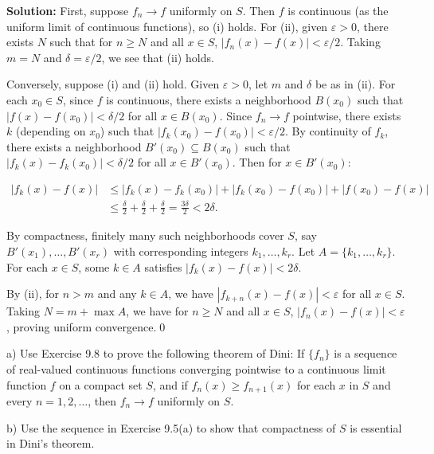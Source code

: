 \bigskip\noindent\textbf{Solution:} First, suppose \( f_n \to f \) uniformly on \( S \). Then \( f \) is continuous (as the uniform limit of continuous functions), so (i) holds. For (ii), given \( \varepsilon > 0 \), there exists \( N \) such that for \( n \geq N \) and all \( x \in S \), \( |f_n(x) - f(x)| < \varepsilon/2 \). Taking \( m = N \) and \( \delta = \varepsilon/2 \), we see that (ii) holds.

Conversely, suppose (i) and (ii) hold. Given \( \varepsilon > 0 \), let \( m \) and \( \delta \) be as in (ii). For each \( x_0 \in S \), since \( f \) is continuous, there exists a neighborhood \( B(x_0) \) such that \( |f(x) - f(x_0)| < \delta/2 \) for all \( x \in B(x_0) \). Since \( f_n \to f \) pointwise, there exists \( k \) (depending on \( x_0 \)) such that \( |f_k(x_0) - f(x_0)| < \varepsilon/2 \). By continuity of \( f_k \), there exists a neighborhood \( B'(x_0) \subseteq B(x_0) \) such that \( |f_k(x) - f_k(x_0)| < \delta/2 \) for all \( x \in B'(x_0) \). Then for \( x \in B'(x_0) \):

\begin{align*}
|f_k(x) - f(x)| &\leq |f_k(x) - f_k(x_0)| + |f_k(x_0) - f(x_0)| + |f(x_0) - f(x)| \\
&\le \frac{\delta}{2} + \frac{\delta}{2} + \frac{\delta}{2} = \frac{3\delta}{2} < 2\delta.
\end{align*}

By compactness, finitely many such neighborhoods cover \( S \), say \( B'(x_1), \ldots, B'(x_r) \) with corresponding integers \( k_1, \ldots, k_r \). Let \( A = \{k_1, \ldots, k_r\} \). For each \( x \in S \), some \( k \in A \) satisfies \( |f_k(x) - f(x)| < 2\delta \).

By (ii), for \( n > m \) and any \( k \in A \), we have \( |f_{k+n}(x) - f(x)| < \varepsilon \) for all \( x \in S \). Taking \( N = m + \max A \), we have for \( n \geq N \) and all \( x \in S \), \( |f_n(x) - f(x)| < \varepsilon \), proving uniform convergence.\qed


\begin{problembox}
a) Use Exercise 9.8 to prove the following theorem of Dini: If \( \{f_n\} \) is a sequence of real-valued continuous functions converging pointwise to a continuous limit function \( f \) on a compact set \( S \), and if \( f_n(x) \geq f_{n+1}(x) \) for each \( x \) in \( S \) and every \( n = 1, 2, \ldots \), then \( f_n \to f \) uniformly on \( S \).

b) Use the sequence in Exercise 9.5(a) to show that compactness of \( S \) is essential in Dini's theorem.
\end{problembox}

